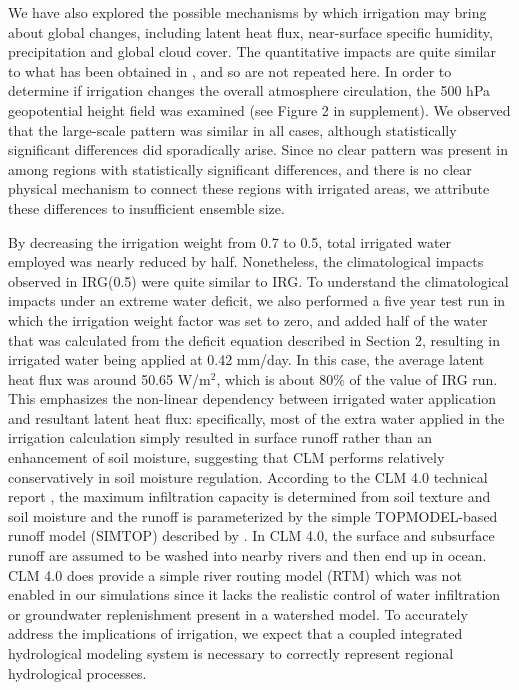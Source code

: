 \documentclass[draft,ms]{agutex}   %
\begin{document}
\begin{article}
We have also explored the possible mechanisms by which irrigation may bring about global changes, including latent heat flux, near-surface specific humidity, precipitation and global cloud cover. The quantitative impacts are quite similar to what has been obtained in \cite{sacks2009effects}, and so are not repeated here. In order to determine if irrigation changes the overall atmosphere circulation, the 500 hPa geopotential height field was examined (see Figure 2 in supplement).  We observed that the large-scale pattern was similar in all cases, although statistically significant differences did sporadically arise. Since no clear pattern was present in among regions with statistically significant differences, and there is no clear physical mechanism to connect these regions with irrigated areas, we attribute these differences to insufficient ensemble size.


By decreasing the irrigation weight from 0.7 to 0.5, total irrigated water employed was nearly reduced by half. Nonetheless, the climatological impacts observed in IRG(0.5) were quite similar to IRG. To understand the climatological impacts under an extreme water deficit, we also performed a five year test run in which the irrigation weight factor was set to zero, and added half of the water that was calculated from the deficit equation described in Section 2, resulting in irrigated water being applied at 0.42 mm/day. In this case, the average latent heat flux was around 50.65 W/m$^2$, which is about 80$\%$ of the value of IRG run.  This emphasizes the non-linear dependency between irrigated water application and resultant latent heat flux: specifically, most of the extra water applied in the irrigation calculation simply resulted in surface runoff rather than an enhancement of soil moisture, suggesting that CLM performs relatively conservatively in soil moisture regulation. According to the CLM 4.0 technical report \citep{CLM40Tech}, the maximum infiltration capacity is determined from soil texture and soil moisture \citep{entekhabi1989land} and the runoff is parameterized by the simple TOPMODEL-based \citep{beven1979physically} runoff model (SIMTOP) described by \cite{niu2005simple}. In CLM 4.0, the surface and subsurface runoff are assumed to be washed into nearby rivers and then end up in ocean.  CLM 4.0 does provide a simple river routing model (RTM) which was not enabled in our simulations since it lacks the realistic control of water infiltration or groundwater replenishment present in a watershed model. To accurately address the implications of irrigation, we expect that a coupled integrated hydrological modeling system is necessary to correctly represent regional hydrological processes.




\end{article}
\end{document}
